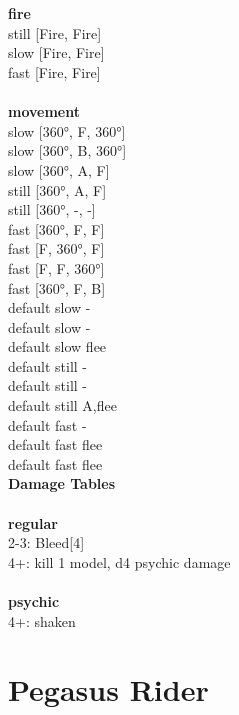  
\ \\



\ \\ {\bf fire } \\
still [Fire, Fire] \\
slow [Fire, Fire] \\
fast [Fire, Fire] \\
\ \\ {\bf movement } \\
slow [360°, F, 360°] \\
slow [360°, B, 360°] \\
slow [360°, A, F] \\
still [360°, A, F] \\
still [360°, -, -] \\
fast [360°, F, F] \\
fast [F, 360°, F] \\
fast [F, F, 360°] \\
fast [360°, F, B] \\
default slow - \\
default slow - \\
default slow flee \\
default still - \\
default still - \\
default still A,flee \\
default fast - \\
default fast flee \\
default fast flee \\


{\bf Damage Tables} \\
\ \\ {\bf regular } \\
2-3: Bleed[4] \\
4+: kill 1 model, d4 psychic damage \\
\ \\ {\bf psychic } \\
4+: shaken \\










\pagebreak\pagebreak

\section{ Pegasus Rider }

